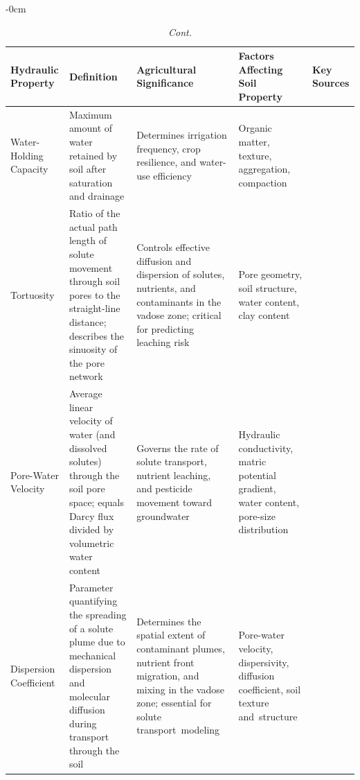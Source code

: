 \documentclass[land,review,accept,pdftex,oneauthor]{Definitions/mdpi}
\begin{document}
\begin{table}[H]\ContinuedFloat
\small
\caption{{\em Cont.}}
\renewcommand{\arraystretch}{1.2}

\begin{adjustwidth}{-\extralength}{0cm}
\begin{minipage}{\fulllength}
\begin{tabularx}{\textwidth}{m{2.6cm}<{\raggedright}m{4cm}<{\raggedright}m{4cm}<{\raggedright}m{3.8cm}<{\raggedright}m{2cm}<{\raggedright}}

\toprule
Hydraulic Property &
Definition &
Agricultural Significance &
Factors Affecting Soil Property &
Key Sources \\
\midrule



Water-Holding Capacity &
Maximum amount of water retained by soil after saturation and drainage &
Determines irrigation frequency, crop resilience, and water-use efficiency &
Organic matter, texture, aggregation, compaction &
\citep{Barik2020,flint2018increasing,Hudson1994,Rawls2003} \\
\midrule

{Tortuosity} &
{Ratio of the actual path length of solute movement through soil pores to the straight-line distance; describes the sinuosity of the pore network} &
{Controls effective diffusion and dispersion of solutes, nutrients, and contaminants in the vadose zone; critical for predicting leaching risk} &
{Pore geometry, soil structure, water content, clay content} &
{\citep{simunek2008hydrus,vereecken2014soil}} \\ 
\midrule

{Pore-Water Velocity} &
{Average linear velocity of water (and dissolved solutes) through the soil pore space; equals Darcy flux divided by volumetric water content} &
{Governs the rate of solute transport, nutrient leaching, and pesticide movement toward groundwater} &
{Hydraulic conductivity, matric potential gradient, water content, pore-size distribution} &
{\citep{simunek2008hydrus,Dane2002}} \\ 
\midrule

{Dispersion Coefficient} &
{Parameter quantifying the spreading of a solute plume due to mechanical dispersion and molecular diffusion during transport through the soil} &
{Determines the spatial extent of contaminant plumes, nutrient front migration, and mixing in the vadose zone; essential for solute transport~modeling} &
{Pore-water velocity, dispersivity, diffusion coefficient, soil texture and~structure} &
{\citep{simunek2008hydrus,vereecken2014soil}} \\


\bottomrule
\end{tabularx}
\end{minipage}
\end{adjustwidth}
\end{table}
\end{document}
